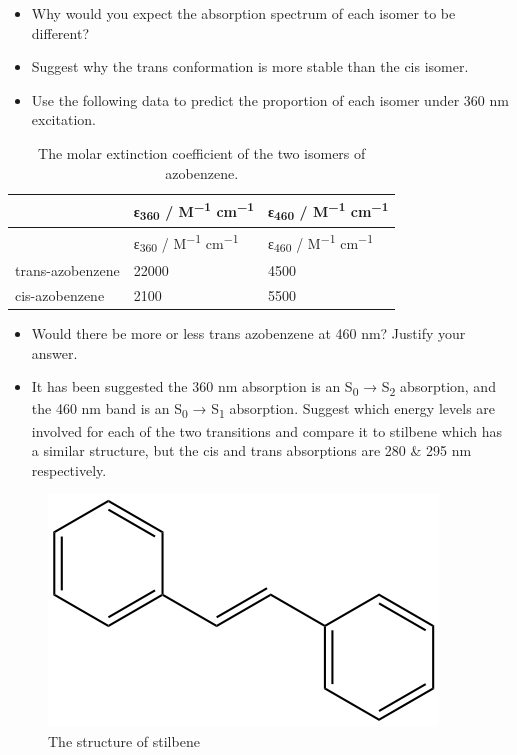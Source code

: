 \documentclass[
]{book}
\begin{document}
\begin{itemize}
\item
  Why would you expect the absorption spectrum of each isomer to be different?
\item
  Suggest why the trans conformation is more stable than the cis isomer.
\item
  Use the following data to predict the proportion of each isomer under 360 nm excitation.
\end{itemize}

\begin{longtable}[]{@{}lll@{}}
\caption{\label{tab:azobenzeneabs} The molar extinction coefficient of the two isomers of azobenzene.}\tabularnewline
\toprule
& ε\textsubscript{360} / M\textsuperscript{−1} cm\textsuperscript{−1} & ε\textsubscript{460} / M\textsuperscript{−1} cm\textsuperscript{−1}\tabularnewline
\midrule
\endfirsthead
\toprule
& ε\textsubscript{360} / M\textsuperscript{−1} cm\textsuperscript{−1} & ε\textsubscript{460} / M\textsuperscript{−1} cm\textsuperscript{−1}\tabularnewline
\midrule
\endhead
trans-azobenzene & 22000 & 4500\tabularnewline
cis-azobenzene & 2100 & 5500\tabularnewline
\bottomrule
\end{longtable}

\begin{itemize}
\item
  Would there be more or less trans azobenzene at 460 nm? Justify your answer.
\item
  It has been suggested the 360 nm absorption is an S\textsubscript{0} → S\textsubscript{2} absorption, and the 460 nm band is an S\textsubscript{0} → S\textsubscript{1} absorption. Suggest which energy levels are involved for each of the two transitions and compare it to stilbene which has a similar structure, but the cis and trans absorptions are 280 \& 295 nm respectively.
\end{itemize}

\begin{figure}

{\centering \includegraphics[width=0.3\linewidth]{images/stilbene} 

}

\caption{The  structure of stilbene}\label{fig:stilbene}
\end{figure}
\end{document}
